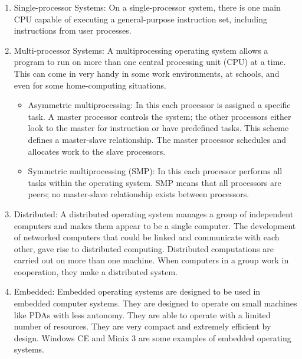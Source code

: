 \documentclass[11pt,a4paper]{article}
\begin{document}
\begin{enumerate}
	\item Single-processor Systems:  On a single-processor system, there is one main CPU capable of executing a general-purpose instruction set, including instructions from user processes.
	\item Multi-processor Systems:  A multiprocessing operating system allows a program to run on more than one central processing unit (CPU) at a time. This can come in very handy in some work environments, at schools, and even for some home-computing situations.
	\begin{itemize}
	\item Asymmetric multiprocessing:  In this each processor is assigned a specific task. A master processor controls the system; the other processors either look to the master for instruction or have predefined tasks. This scheme defines a master-slave relationship. The master processor schedules and allocates work to the slave processors.
	\item Symmetric multiprocessing (SMP):  In this each processor performs all tasks within the operating system. SMP means that all processors are peers; no master-slave relationship exists between processors.
	\end{itemize}
	\item Distributed:  A distributed operating system manages a group of independent computers and makes them appear to be a single computer. The development of networked computers that could be linked and communicate with each other, gave rise to distributed computing. Distributed computations are carried out on more than one machine. When computers in a group work in cooperation, they make a distributed system.
	\item Embedded: Embedded operating systems are designed to be used in embedded computer systems. They are designed to operate on small machines like PDAs with less autonomy. They are able to operate with a limited number of resources. They are very compact and extremely efficient by design. Windows CE and Minix 3 are some examples of embedded operating systems.
	\end{enumerate}
	
	\newpage
\end{document}

